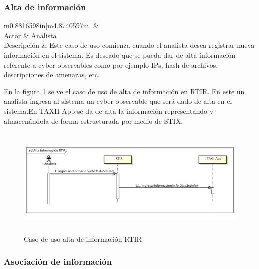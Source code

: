 \subsubsection{Alta de información}

\begin{flushleft}
	\tablefirsthead{}
	\tablehead{}
	\tabletail{}
	\tablelasttail{}
	\begin{supertabular}{m{0.8816598in}|m{4.8740597in}|}
		 &
		\\\hline
		{Actor} &
		{Analista}\\
		{Descripción} &
		{Este caso de uso comienza cuando el analista desea registrar nueva información en
			el sistema. Es deseado que se pueda dar de alta información
			referente a cyber observables como por ejemplo IPs, hash de archivos, descripciones de amenazas, etc.}\\\hhline{~-}
	\end{supertabular}
\end{flushleft}
\bigskip
En la figura \ref{fig.altainfortir} se ve el caso de uso de alta de información en RTIR. En este un analista ingresa al sistema un cyber observable que será dado de alta en el sistema.En TAXII App se da de alta la información representando y
almacenándola de forma estructurada por medio de STIX.

\begin{figure}[H]
	\centering
	\includegraphics[width=5.7638in,height=2.0701in]{Analisis22-img/AltaInfoRTIR.png} 
	\caption{Caso de uso alta de información RTIR}
	\label{fig.altainfortir}
\end{figure}

\subsubsection{Asociación de información}


